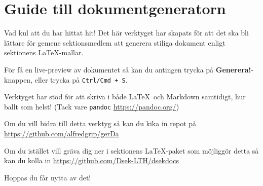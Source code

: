 \documentclass{dsekdoc}
\begin{document}
\setdate{}
\setmeeting{}

\section*{Guide till dokumentgeneratorn}
Vad kul att du har hittat hit! 
Det här verktyget har skapats för att det ska bli lättare för gemene sektionsmedlem
att generera stiliga dokument enligt sektionens \LaTeX-mallar.

För få en live-preview av dokumentet så kan du antingen trycka på \textbf{Generera!}-knappen, eller trycka på \texttt{Ctrl/Cmd + S}.

Verktyget har stöd för att skriva i både \LaTeX~och Markdown samtidigt, hur ballt som helst! 
\newline(Tack vare \texttt{pandoc} \url{https://pandoc.org/})

Om du vill bidra till detta verktyg så kan du kika in repot på \url{
    https://github.com/alfredgrip/gerDa
}

Om du istället vill gräva dig ner i sektionens \LaTeX-paket som möjliggör detta så kan du kolla in \url{
    https://github.com/Dsek-LTH/dsekdocs
}

Hoppas du får nytta av det!
\end{document}
